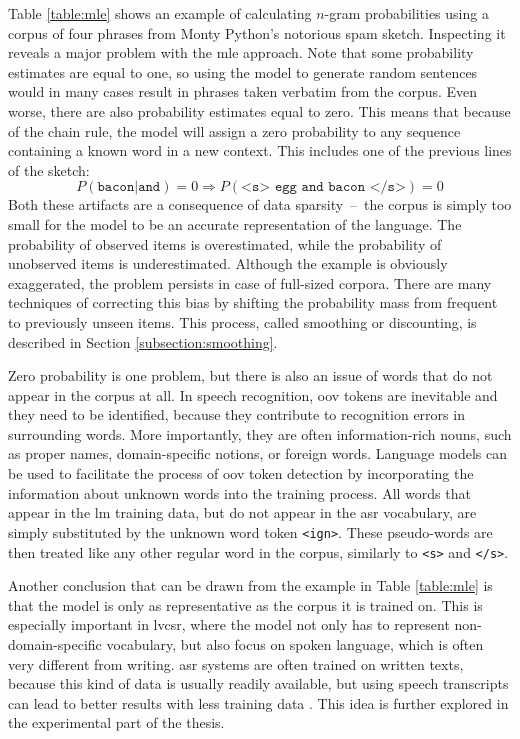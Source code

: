 Table \ref{table:mle} shows an example of calculating \mbox{$n$-gram} probabilities using a corpus of four phrases from Monty Python's notorious spam sketch. Inspecting it reveals a major problem with the \gls{mle} approach. Note that some probability estimates are equal to one, so using the model to generate random sentences would in many cases result in phrases taken verbatim from the corpus. Even worse, there are also probability estimates equal to zero. This means that because of the chain rule, the model will assign a zero probability to any sequence containing a known word in a new context. This includes one of the previous lines of the sketch:
	\begin{equation}
		P(\texttt{bacon}|\texttt{and})=0 \Rightarrow P(\texttt{<s> egg and bacon </s>})=0
	\end{equation}
	Both these artifacts are a consequence of data sparsity~--~the corpus is simply too small for the model to be an accurate representation of the language. The probability of observed items is overestimated, while the probability of unobserved items is underestimated. Although the example is obviously exaggerated, the problem persists in case of full-sized corpora. There are many techniques of correcting this bias by shifting the probability mass from frequent to previously unseen items. This process, called smoothing or discounting, is described in Section \ref{subsection:smoothing}. 

	Zero probability is one problem, but there is also an issue of words that do not appear in the corpus at all. In speech recognition, \gls{oov} tokens are inevitable and they need to be identified, because they contribute to recognition errors in surrounding words. More importantly, they are often information-rich nouns, such as proper names, domain-specific notions, or foreign words. Language models can be used to facilitate the process of \gls{oov} token detection by incorporating the information about unknown words into the training process. All words that appear in the \gls{lm} training data, but do not appear in the \gls{asr} vocabulary, are simply substituted by the unknown word token \texttt{<ign>}. These pseudo-words are then treated like any other regular word in the corpus, similarly to \texttt{<s>} and \texttt{</s>}. 

	Another conclusion that can be drawn from the example in Table \ref{table:mle} is that the model is only as representative as the corpus it is trained on. This is especially important in \gls{lvcsr}, where the model not only has to represent non-domain-specific vocabulary, but also focus on spoken language, which is often very different from writing. \gls{asr} systems are often trained on written texts, because this kind of data is usually readily available, but using speech transcripts can lead to better results with less training data \cite{dziadzio2015comparison}. This idea is further explored in the experimental part of the thesis.

